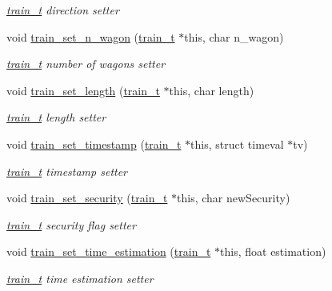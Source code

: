 \begin{DoxyCompactItemize}
\begin{DoxyCompactList}\small\item\em \hyperlink{structtrain__t}{train\-\_\-t} direction setter \end{DoxyCompactList}\item 
void \hyperlink{group__train__t__setters_ga14c07ee75ff05954fe06fe7e187ad04a}{train\-\_\-set\-\_\-n\-\_\-wagon} (\hyperlink{structtrain__t}{train\-\_\-t} $\ast$this, char n\-\_\-wagon)
\begin{DoxyCompactList}\small\item\em \hyperlink{structtrain__t}{train\-\_\-t} number of wagons setter \end{DoxyCompactList}\item 
void \hyperlink{group__train__t__setters_ga75af5d0747eb13940d49473e8a010ea1}{train\-\_\-set\-\_\-length} (\hyperlink{structtrain__t}{train\-\_\-t} $\ast$this, char length)
\begin{DoxyCompactList}\small\item\em \hyperlink{structtrain__t}{train\-\_\-t} length setter \end{DoxyCompactList}\item 
void \hyperlink{group__train__t__setters_gad97f936e5b8c36d25d3093883059df71}{train\-\_\-set\-\_\-timestamp} (\hyperlink{structtrain__t}{train\-\_\-t} $\ast$this, struct timeval $\ast$tv)
\begin{DoxyCompactList}\small\item\em \hyperlink{structtrain__t}{train\-\_\-t} timestamp setter \end{DoxyCompactList}\item 
void \hyperlink{group__train__t__setters_ga654e076f158d7664ddbe21dda7cf8c75}{train\-\_\-set\-\_\-security} (\hyperlink{structtrain__t}{train\-\_\-t} $\ast$this, char new\-Security)
\begin{DoxyCompactList}\small\item\em \hyperlink{structtrain__t}{train\-\_\-t} security flag setter \end{DoxyCompactList}\item 
void \hyperlink{group__train__t__setters_gaf068d494a8e8aecc208669af3c813584}{train\-\_\-set\-\_\-time\-\_\-estimation} (\hyperlink{structtrain__t}{train\-\_\-t} $\ast$this, float estimation)
\begin{DoxyCompactList}\small\item\em \hyperlink{structtrain__t}{train\-\_\-t} time estimation setter \end{DoxyCompactList}\item 

\end{DoxyCompactItemize}
